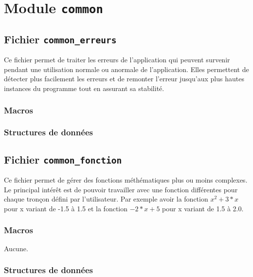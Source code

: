 \documentclass{article}
\begin{document}
\section{Module {\texttt{common}}}
\subsection{Fichier {\texttt{common\_erreurs}}}
Ce fichier permet de traiter les erreurs de l'application qui peuvent survenir pendant une utilisation normale ou anormale de l'application. Elles permettent de détecter plus facilement les erreurs et de remonter l'erreur jusqu'aux plus hautes instances du programme tout en assurant sa stabilité.
\subsubsection{Macros}


\subsubsection{Structures de données}
\subsection{Fichier {\texttt{common\_fonction}}}
Ce fichier permet de gérer des fonctions méthématiques plus ou moins complexes. Le principal intérêt est de pouvoir travailler avec une fonction différentes pour chaque tronçon défini par l'utilisateur. Par exemple avoir la fonction $x^2+3*x$ pour x variant de -1.5 à 1.5 et la fonction $-2*x+5$ pour x variant de 1.5 à 2.0.
\subsubsection{Macros}
Aucune.
\subsubsection{Structures de données}












\end{document}
